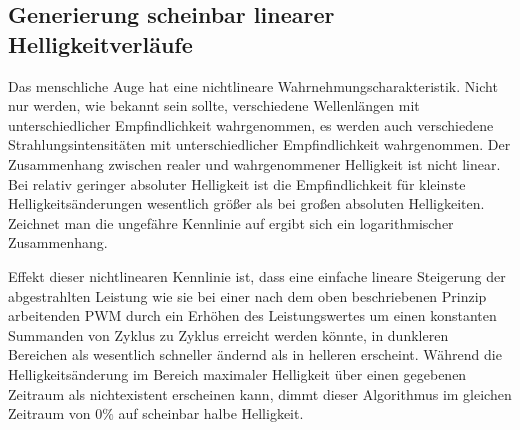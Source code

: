 \documentclass[12pt,a4paper,notitlepage]{article}
\begin{document}
\subsection{Generierung scheinbar linearer Helligkeitverläufe}
Das menschliche Auge hat eine nichtlineare Wahrnehmungscharakteristik. Nicht nur werden, wie bekannt sein sollte, verschiedene Wellenlängen mit unterschiedlicher Empfindlichkeit wahrgenommen, es werden auch verschiedene Strahlungsintensitäten mit unterschiedlicher Empfindlichkeit wahrgenommen. Der Zusammenhang zwischen realer und wahrgenommener Helligkeit ist nicht linear. Bei relativ geringer absoluter Helligkeit ist die Empfindlichkeit für kleinste Helligkeitsänderungen wesentlich größer als bei großen absoluten Helligkeiten. Zeichnet man die ungefähre Kennlinie auf ergibt sich ein logarithmischer Zusammenhang.

Effekt dieser nichtlinearen Kennlinie ist, dass eine einfache lineare Steigerung der abgestrahlten Leistung wie sie bei einer nach dem oben beschriebenen Prinzip arbeitenden \gls{PWM} durch ein Erhöhen des Leistungswertes um einen konstanten Summanden von Zyklus zu Zyklus erreicht werden könnte, in dunkleren Bereichen als wesentlich schneller ändernd als in helleren erscheint. Während die Helligkeitsänderung im Bereich maximaler Helligkeit über einen gegebenen Zeitraum als nichtexistent erscheinen kann, dimmt dieser Algorithmus im gleichen Zeitraum von $0\%$ auf scheinbar halbe Helligkeit.
\end{document}
